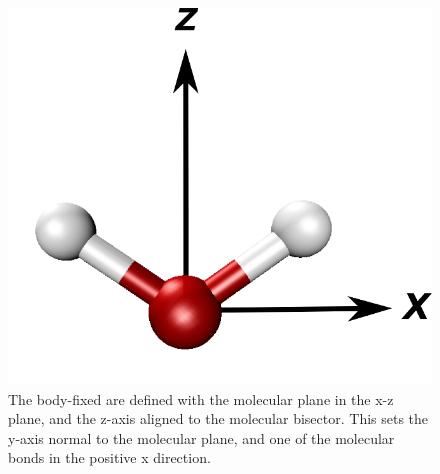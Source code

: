 
\begin{figure}[h!]
	\begin{center}
		\includegraphics[scale=1.0]{images/molecularframesmall.png}
		\caption{The body-fixed are defined with the molecular plane in the x-z plane, and the z-axis aligned to the molecular bisector. This sets the y-axis normal to the molecular plane, and one of the molecular bonds in the positive x direction.}
		\label{fig:molecular-frame}
	\end{center}
\end{figure}

